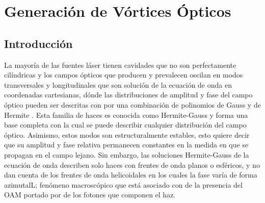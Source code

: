 \chapter{Generación de Vórtices Ópticos}
\label{sec:OV_gen}
\label{sec:ChGV_Caracterizacion_de_SLM}
\section{Introducción}
La mayoría de las fuentes láser tienen cavidades que no son
perfectamente cilíndricas y los campos ópticos que producen y
prevalecen oscilan en
modos transversales y longitudinales que son solución de la ecuación
de onda en coordenadas cartesianas, dónde las distribuciones de amplitud y fase
del campo óptico pueden ser descritas con por una
combinación de polinomios de Gauss y de Hermite
. Esta familia de haces es conocida como
Hermite-Gauss y forma una base completa con la cual se puede describir
cualquier distribución del campo óptico. Asimismo, estos modos son
estructuralmente estables, esto quiere decir que su amplitud y fase
relativa permanecen constantes en la medida en que se propagan en el
campo lejano. Sin embargo, las soluciones Hermite-Gauss de la ecuación de onda
describen solo haces con frentes de onda planos o esféricos, y no dan
cuenta de los frentes de onda helicoidales en los cuales la fase varía
de forma azimutalL; fenómeno macroscópico que está asociado con de la
presencia del \acrshort{OAM} portado por de los fotones que componen
el haz.

